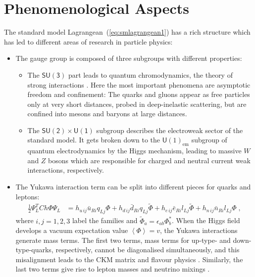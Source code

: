 \documentclass[12pt]{report}
\newcommand{\ls}{{\ensuremath{\scriptscriptstyle L}}}
\newcommand{\rs}{{\ensuremath{\scriptscriptstyle R}}}
\newcommand{\2}{\ensuremath{\sqrt{2}\,}}
\begin{document}
    \section{Phenomenological Aspects}
    The standard model Lagrangean~(\ref{eq:smlagrangean1}) has a rich
    structure which has led to different areas of research in particle physics:
    \begin{itemize}
      \item The gauge group is composed of three subgroups with different properties:
        \begin{itemize}
          \item The $\mathsf{SU(3)}$ part leads to quantum chromodynamics, the theory of strong
            interactions \cite{ecker}. Here the most important phenomena are asymptotic
            freedom and confinement: The quarks and gluons appear as free particles only at very
            short distances, probed in deep-inelastic scattering, but are confined into mesons 
            and baryons at large distances.
          \item The $\mathsf{SU(2) \times U(1)}$ subgroup describes the electroweak sector of the
            standard model. It gets broken down to the $\mathsf U(1)_\text{em}$ subgroup of quantum
            electrodynamics by the Higgs mechanism, leading to massive $W$ and $Z$ bosons which are 
            responsible for charged and neutral current weak interactions, respectively.
      \end{itemize}
      \item The Yukawa interaction term can be split into different pieces for quarks and leptons:
        \begin{align}
          \frac{1}{2} \Psi_L^T C h \Phi \Psi_L &= h_{u \, ij} \bar{u}_{\rs i} q_{\ls j} \Phi + h_{d \, ij}
          \bar{d}_{\rs i} q_{\ls j} \widetilde{\Phi} +h_{e \, ij} \bar{e}_{\rs i} l_{\ls j}
          \widetilde{\Phi} +h_{n \, ij} \bar{n}_{\rs i} l_{\ls j} \Phi\;,
        \end{align}
        where $i,j=1,2,3$ label the families and $\widetilde{\Phi}_a =\epsilon_{ab} \Phi_b^*$. 
        When the Higgs field develops a vacuum expectation
        value $\left<\Phi\right>=v$, the Yukawa interactions generate mass terms. The first two terms,
        mass terms for up-type- and down-type-quarks, respectively, cannot be diagonalised 
        simultaneously,
        and this misalignment leads to the CKM matrix and flavour physics \cite{fleischer}. 
        Similarly, the
        last two terms give rise to lepton masses and neutrino mixings \cite{lindner}.
    \end{itemize}
    
\end{document}
